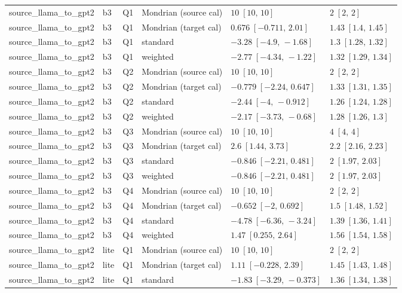 \begin{longtable}{@{}p{}p{}p{}p{}p{}p{}@{}}
source\_llama\_to\_gpt2 & b3 & Q1 & Mondrian (source cal) & $10\;[10,\,10]$ & $2\;[2,\,2]$ \\
source\_llama\_to\_gpt2 & b3 & Q1 & Mondrian (target cal) & $0.676\;[-0.711,\,2.01]$ & $1.43\;[1.4,\,1.45]$ \\
source\_llama\_to\_gpt2 & b3 & Q1 & standard & $-3.28\;[-4.9,\,-1.68]$ & $1.3\;[1.28,\,1.32]$ \\
source\_llama\_to\_gpt2 & b3 & Q1 & weighted & $-2.77\;[-4.34,\,-1.22]$ & $1.32\;[1.29,\,1.34]$ \\
source\_llama\_to\_gpt2 & b3 & Q2 & Mondrian (source cal) & $10\;[10,\,10]$ & $2\;[2,\,2]$ \\
source\_llama\_to\_gpt2 & b3 & Q2 & Mondrian (target cal) & $-0.779\;[-2.24,\,0.647]$ & $1.33\;[1.31,\,1.35]$ \\
source\_llama\_to\_gpt2 & b3 & Q2 & standard & $-2.44\;[-4,\,-0.912]$ & $1.26\;[1.24,\,1.28]$ \\
source\_llama\_to\_gpt2 & b3 & Q2 & weighted & $-2.17\;[-3.73,\,-0.68]$ & $1.28\;[1.26,\,1.3]$ \\
source\_llama\_to\_gpt2 & b3 & Q3 & Mondrian (source cal) & $10\;[10,\,10]$ & $4\;[4,\,4]$ \\
source\_llama\_to\_gpt2 & b3 & Q3 & Mondrian (target cal) & $2.6\;[1.44,\,3.73]$ & $2.2\;[2.16,\,2.23]$ \\
source\_llama\_to\_gpt2 & b3 & Q3 & standard & $-0.846\;[-2.21,\,0.481]$ & $2\;[1.97,\,2.03]$ \\
source\_llama\_to\_gpt2 & b3 & Q3 & weighted & $-0.846\;[-2.21,\,0.481]$ & $2\;[1.97,\,2.03]$ \\
source\_llama\_to\_gpt2 & b3 & Q4 & Mondrian (source cal) & $10\;[10,\,10]$ & $2\;[2,\,2]$ \\
source\_llama\_to\_gpt2 & b3 & Q4 & Mondrian (target cal) & $-0.652\;[-2,\,0.692]$ & $1.5\;[1.48,\,1.52]$ \\
source\_llama\_to\_gpt2 & b3 & Q4 & standard & $-4.78\;[-6.36,\,-3.24]$ & $1.39\;[1.36,\,1.41]$ \\
source\_llama\_to\_gpt2 & b3 & Q4 & weighted & $1.47\;[0.255,\,2.64]$ & $1.56\;[1.54,\,1.58]$ \\
source\_llama\_to\_gpt2 & lite & Q1 & Mondrian (source cal) & $10\;[10,\,10]$ & $2\;[2,\,2]$ \\
source\_llama\_to\_gpt2 & lite & Q1 & Mondrian (target cal) & $1.11\;[-0.228,\,2.39]$ & $1.45\;[1.43,\,1.48]$ \\
source\_llama\_to\_gpt2 & lite & Q1 & standard & $-1.83\;[-3.29,\,-0.373]$ & $1.36\;[1.34,\,1.38]$ \\

\end{longtable}

